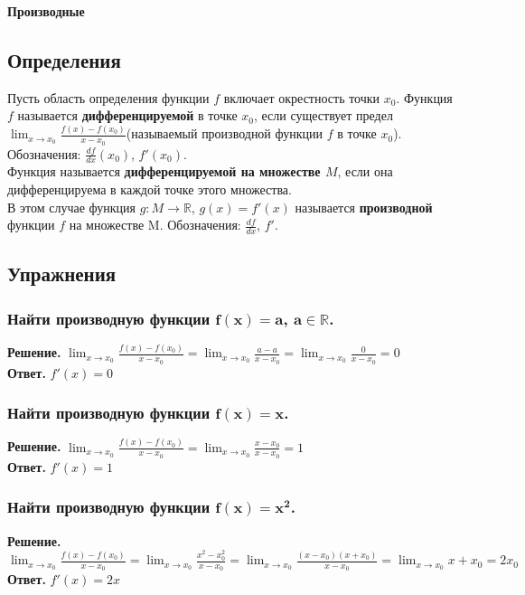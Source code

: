 \documentclass[11pt,a4paper]{article}
\newcommand\RR{{\mathbb R}}
\begin{document}
{\huge \bf{Производные}}
\subsection{Определения}
Пусть область определения функции $f$ включает окрестность точки $x_0$. Функция $f$ называется {\bf дифференцируемой} в точке $x_0$, если существует предел $ \lim_{x \to x_0} \frac{f(x) - f(x_0)}{x - x_0} $(называемый производной функции $f$ в точке $x_0$). Обозначения: $\frac{df}{dx}(x_0)$, $f'(x_0)$.\\
Функция называется {\bf дифференцируемой на множестве $M$}, если она дифференцируема в каждой точке этого множества. \\
В этом случае функция $g : M \to \RR$, $g(x)= f'(x)$ называется {\bf производной} функции $f$ на множестве M. Обозначения: $\frac{df}{dx}$, $f'$.

\subsection{Упражнения}
\subsubsection{Найти производную функции  $\mathbf{f(x) = a}$, $\mathbf{a \in \RR}$.}
{\bf Решение.} $\lim_{x \to x_0} \frac{f(x) - f(x_0)}{x - x_0} = \lim_{x \to x_0} \frac{a - a}{x - x_0} = \lim_{x \to x_0} \frac{0}{x - x_0} = 0$\\
{\bf Ответ.} $f'(x) = 0$

\subsubsection{Найти производную функции $\mathbf{f(x) = x}$.}
{\bf Решение.} $\lim_{x \to x_0} \frac{f(x) - f(x_0)}{x - x_0} = \lim_{x \to x_0} \frac{x - x_0}{x - x_0} = 1$\\
{\bf Ответ.} $f'(x) = 1$

\subsubsection{Найти производную функции $\mathbf{f(x) = x^2}$.}
{\bf Решение.} $\lim_{x \to x_0} \frac{f(x) - f(x_0)}{x - x_0} = \lim_{x \to x_0} \frac{x^2 - x_0^2}{x - x_0} = \lim_{x \to x_0} \frac{(x - x_0)(x + x_0)}{x - x_0} = \lim_{x \to x_0} x + x_0 = 2x_0$\\
{\bf Ответ.} $f'(x) = 2x$
\end{document}
